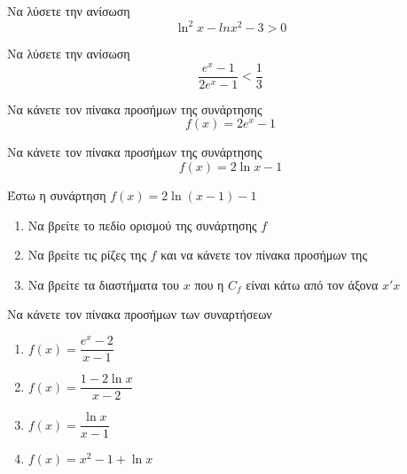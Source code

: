 \documentclass[greek]{beamer}
\begin{document}
\begin{askisi}
  Να λύσετε την ανίσωση
  $$\ln^2x-ln x^2-3>0$$


\end{askisi}

\begin{askisi}
  Να λύσετε την ανίσωση $$\dfrac{e^x-1}{2e^x-1}<\dfrac{1}{3}$$


\end{askisi}

\begin{askisi}
  Να κάνετε τον πίνακα προσήμων της συνάρτησης $$f(x)=2e^x-1$$


\end{askisi}

\begin{askisi}
  Να κάνετε τον πίνακα προσήμων της συνάρτησης $$f(x)=2\ln x-1$$


\end{askisi}

\begin{askisi}
  Έστω η συνάρτηση $f(x)=2\ln (x-1)-1$
  \begin{enumerate}
    \item<1-> Να βρείτε το πεδίο ορισμού της συνάρτησης $f$
    \item<2-> Να βρείτε τις ρίζες της $f$ και να κάνετε τον πίνακα προσήμων της
    \item<3-> Να βρείτε τα διαστήματα του $x$ που η $C_f$ είναι κάτω από τον άξονα $x'x$
  \end{enumerate}


\end{askisi}

\begin{askisi}
  Να κάνετε τον πίνακα προσήμων των συναρτήσεων
  \begin{enumerate}
    \item<1-> $f(x)=\dfrac{e^x-2}{x-1}$
    \item<2-> $f(x)=\dfrac{1-2\ln x}{x-2}$
    \item<3-> $f(x)=\dfrac{\ln x}{x-1}$
    \item<4-> $f(x)=x^2-1+\ln x$
  \end{enumerate}


\end{askisi}
\end{document}
